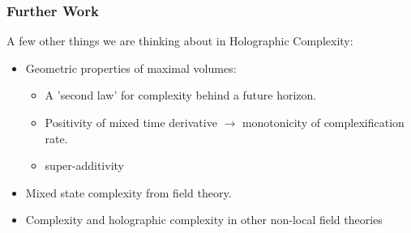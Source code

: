 \documentclass[8pt,aspectratio=169]{beamer}
\begin{document}
\begin{frame}
\frametitle{Further Work}

A few other things we are thinking about in Holographic Complexity:

\begin{itemize}

\item Geometric properties of maximal volumes:

\begin{itemize}

	\item A 'second law' for complexity behind a future horizon.
	
	\item Positivity of mixed time  derivative $\rightarrow$ monotonicity of complexification rate.
	
	\item super-additivity

\end{itemize}

\item Mixed state complexity from field theory.

\item Complexity and holographic complexity in other non-local field theories

\end{itemize}

\end{frame}

\end{document}
